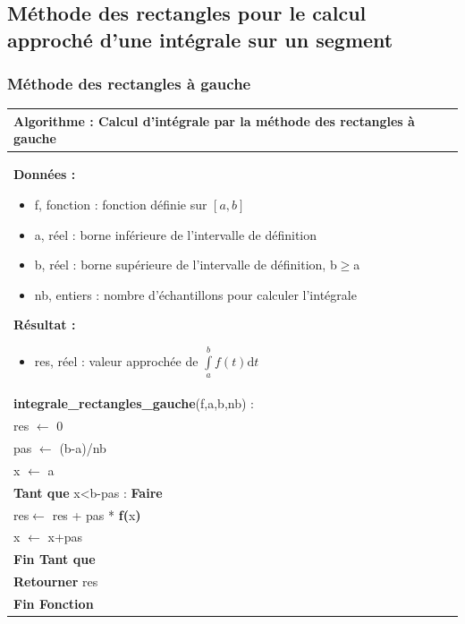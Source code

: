 \documentclass[10pt]{article}
\begin{document}
\subsection{Méthode des rectangles pour le calcul approché d'une intégrale sur un segment}
\subsubsection{Méthode des rectangles à gauche}

\begin{pseudo}
\begin{center}
\begin{tabular}{p{}}
\hline
\textbf{Algorithme :} Calcul d'intégrale par la méthode des rectangles à gauche\\
\hline
\textbf{Données :}
\begin{itemize}
\item \textsf{f}, fonction : fonction définie sur $[a,b]$  
\item \textsf{a}, réel : borne inférieure de l'intervalle de définition
\item \textsf{b}, réel : borne supérieure de l'intervalle de définition, \textsf{b$\geq$a}
\item \textsf{nb}, entiers : nombre d'échantillons pour calculer l'intégrale
\end{itemize}
\textbf{Résultat :} 
\begin{itemize}
\item \textsf{res}, réel : valeur approchée de $\int\limits_a^b f(t)\text{d}t$
\end{itemize}
\\
\textbf{integrale\_rectangles\_gauche}(\textsf{f,a,b,nb}) :\\
\hspace{.4cm}\textsf{res} $\leftarrow$ \textsf{0}\\
\hspace{.4cm}\textsf{pas} $\leftarrow$ \textsf{(b-a)/nb}\\
\hspace{.4cm}\textsf{x} $\leftarrow$ \textsf{a}\\
\hspace{.4cm}\textbf{Tant que} \textsf{x<b-pas} : \textbf{Faire}\\
\hspace{.8cm}\textsf{res}$\leftarrow$ \textsf{res + pas *} \textbf{f(}\textsf{x}\textbf{)}\\
\hspace{.8cm}\textsf{x} $\leftarrow$ \textsf{x+pas}\\
\hspace{.4cm}\textbf{Fin Tant que} \\
\hspace{.4cm}\textbf{Retourner} \textsf{res}\\
\textbf{Fin Fonction} \\
\hline
\end{tabular}
\end{center}
\end{pseudo}
\end{document}
